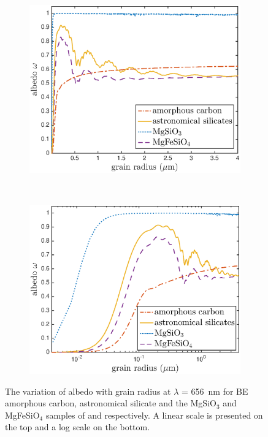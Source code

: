\begin{figure}
\begin{subfigure}{1\textwidth}
\centering
\includegraphics[trim =20 0 45 15,clip=true,scale=0.7]{chapters/chapter4/images/albedo_grainsize_upto4}
\end{subfigure}\\[1ex]
\begin{subfigure}{1\textwidth}
\centering
\includegraphics[trim =20 0 45 15,clip=true,scale=0.7]{chapters/chapter4/images/albedo_grainsize_upto4_log}
\end{subfigure}
\caption{The variation of albedo with grain radius at $\lambda$ =  656~nm for \citet{Zubko1996} BE amorphous 
carbon, \citet{Draine1984} astronomical silicate and the
MgSiO$_3$ and MgFeSiO$_4$ samples of \citet{Jager2003} and 
\citet{Dorschner1995} respectively. A linear scale is presented on the top and a log scale on the bottom.}
\label{albedo_grain}
\end{figure}

